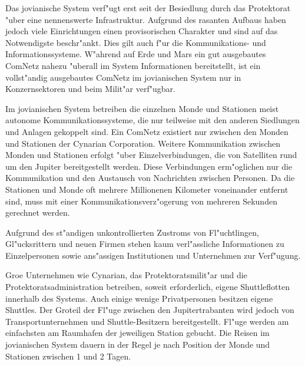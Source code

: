 
Das jovianische System verf"ugt erst seit der Besiedlung durch das Protektorat "uber eine nennenswerte Infrastruktur. Aufgrund des rasanten Aufbaus haben jedoch viele Einrichtungen einen provisorischen Charakter und sind auf das Notwendigste beschr"ankt. Dies gilt auch f"ur die Kommunikations- und Informationssysteme. W"ahrend auf Erde und Mars ein gut ausgebautes ComNetz nahezu "uberall im System Informationen bereitstellt, ist ein vollst"andig ausgebautes ComNetz im jovianischen System nur in Konzernsektoren und beim Milit"ar verf"ugbar.

Im jovianischen System betreiben die einzelnen Monde und Stationen meist autonome Kommunikationssysteme, die nur teilweise mit den anderen Siedlungen und Anlagen gekoppelt sind. Ein ComNetz existiert nur zwischen den Monden und Stationen der Cynarian Corporation. Weitere Kommunikation zwischen Monden und Stationen erfolgt "uber Einzelverbindungen, die von Satelliten rund um den Jupiter bereitgestellt werden. Diese Verbindungen erm"oglichen nur die Kommunikation und den Austausch von Nachrichten zwischen Personen. Da die Stationen und Monde oft mehrere Millionenen Kilometer voneinander entfernt sind, muss mit einer Kommunikationsverz"ogerung von mehreren Sekunden gerechnet werden.

Aufgrund des st"andigen unkontrollierten Zustroms von Fl"uchtlingen, Gl"ucksrittern und neuen Firmen stehen kaum verl"assliche Informationen zu Einzelpersonen sowie ans"assigen Institutionen und Unternehmen zur Verf"ugung.


Gro\3e Unternehmen wie Cynarian, das Protektoratsmilit"ar und die Protektoratsadministration betreiben, soweit erforderlich, eigene Shuttleflotten innerhalb des Systems. Auch einige wenige Privatpersonen besitzen eigene Shuttles. Der Gro\3teil der Fl"uge zwischen den Jupitertrabanten wird jedoch von Transportunternehmen und Shuttle-Besitzern bereitgestellt. Fl"uge werden am einfachsten am Raumhafen der jeweiligen Station gebucht. Die Reisen im jovianischen System dauern in der Regel je nach Position der Monde und Stationen zwischen 1 und 2 Tagen.
